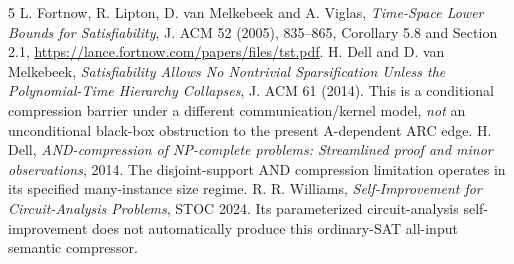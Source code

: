 \documentclass[11pt]{article}
\begin{document}
\begin{thebibliography}{5}
 L. Fortnow, R. Lipton, D. van Melkebeek and A. Viglas, \emph{Time-Space Lower Bounds for Satisfiability}, J. ACM 52 (2005), 835--865, Corollary 5.8 and Section 2.1, \url{https://lance.fortnow.com/papers/files/tst.pdf}.
 H. Dell and D. van Melkebeek, \emph{Satisfiability Allows No Nontrivial Sparsification Unless the Polynomial-Time Hierarchy Collapses}, J. ACM 61 (2014). This is a conditional compression barrier under a different communication/kernel model, \emph{not} an unconditional black-box obstruction to the present A-dependent ARC edge.
 H. Dell, \emph{AND-compression of NP-complete problems: Streamlined proof and minor observations}, 2014. The disjoint-support AND compression limitation operates in its specified many-instance size regime.
 R. R. Williams, \emph{Self-Improvement for Circuit-Analysis Problems}, STOC 2024. Its parameterized circuit-analysis self-improvement does not automatically produce this ordinary-SAT all-input semantic compressor.
\end{thebibliography}
\end{document}
